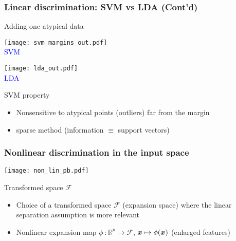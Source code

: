 \begin{frame}
  \frametitle{Linear discrimination:  SVM vs LDA (Cont'd)}

\begin{block}{Adding one atypical data}
\end{block}


\begin{minipage}{0.35\textwidth}
\begin{center}
\texttt{[image: svm\_margins\_out.pdf]}\\
\textcolor{blue}{SVM}
\end{center}
\end{minipage}
\hfill
\begin{minipage}{0.35\textwidth}
\begin{center}
\texttt{[image: lda\_out.pdf]}\\
\textcolor{blue}{LDA}
\end{center}
\end{minipage}

  \begin{block}{SVM property}
   \begin{itemize}
    \item Nonsensitive to atypical points (outliers) far from the margin
    \item[\doigt] sparse method (information $\equiv$ support vectors)
   \end{itemize}
  \end{block}

\end{frame}

\begin{frame}
  \frametitle{Nonlinear discrimination in the input space}


\begin{center}
\texttt{[image: non\_lin\_pb.pdf]}
\end{center}

\begin{block}{Transformed space $\mathcal{F}$}
\begin{itemize}
   \item Choice of a transformed space  $\mathcal{F}$ (expansion space) where
   the linear separation assumption is more relevant
   \item Nonlinear expansion map $\phi~: \mathbb{R}^p \rightarrow \mathcal{F} $, ${\boldsymbol{x}}\mapsto \phi({\boldsymbol{x}})$ (enlarged features)
\end{itemize}


\end{block}


\end{frame}

